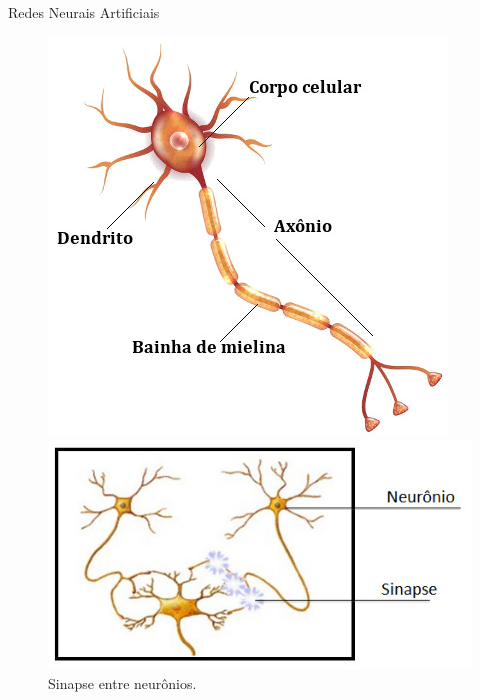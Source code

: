 \begin{frame}{Redes Neurais Artificiais}
     \ \  \\[0.1cm]

\begin{figure}
	\caption{Redes neurais biológicas.}
	\begin{minipage}[h]{0.5\linewidth}
          \centering
		\caption{Neurônio biológico e seus componentes.}
		\label{fig:neuronio_biologico}
		\includegraphics[width=0.7\linewidth]{img/neuronio}
	\end{minipage}%
	\begin{minipage}[h]{0.6\linewidth}
          \centering
		\caption{Sinapse entre neurônios.}
		\label{fig:redeneuralbiologica}
		\includegraphics[width=0.7\linewidth]{./img/redeneuralbiologica.jpg}
	\end{minipage}%
\end{figure}
\end{frame}

